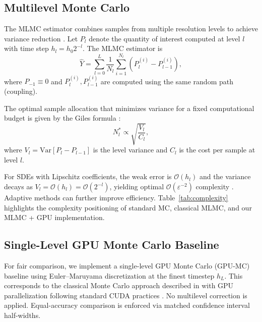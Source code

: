 \documentclass[journal]{IEEEtran}
\begin{document}
\subsection{Multilevel Monte Carlo}

The MLMC estimator combines samples from multiple resolution levels to achieve variance reduction
\cite{giles2008multilevel,giles2015multilevel}. Let $P_l$ denote the quantity of interest
computed at level $l$ with time step $h_l = h_0 2^{-l}$. The MLMC estimator is
\begin{equation}
    \hat{Y} = \sum_{l=0}^{L} \frac{1}{N_l} \sum_{i=1}^{N_l}
    \left(P_l^{(i)} - P_{l-1}^{(i)}\right),
    \label{eq:mlmc}
\end{equation}
where $P_{-1} \equiv 0$ and $P_l^{(i)}, P_{l-1}^{(i)}$ are computed using the same random path
(coupling).

The optimal sample allocation that minimizes variance for a fixed computational budget is given
by the Giles formula \cite{giles2015multilevel}:
\begin{equation}
    N_l^* \propto \sqrt{\frac{V_l}{C_l}},
    \label{eq:giles}
\end{equation}
where $V_l = \mathrm{Var}[P_l - P_{l-1}]$ is the level variance and $C_l$ is the cost per sample
at level $l$.

For SDEs with Lipschitz coefficients, the weak error is $\mathcal{O}(h_l)$ and the variance
decays as $V_l = \mathcal{O}(h_l) = \mathcal{O}(2^{-l})$, yielding optimal
$\mathcal{O}(\varepsilon^{-2})$ complexity \cite{giles2015multilevel,higham2015}. Adaptive
methods \cite{collier2015} can further improve efficiency. Table~\ref{tab:complexity}
highlights the complexity positioning of standard MC, classical MLMC, and our MLMC + GPU
implementation.

\subsection{Single-Level GPU Monte Carlo Baseline}

For fair comparison, we implement a single-level GPU Monte Carlo (GPU-MC) baseline using
Euler--Maruyama discretization at the finest timestep $h_L$. This corresponds to the classical
Monte Carlo approach described in \cite{glasserman2003monte} with GPU parallelization following
standard CUDA practices \cite{nvidia2020cuda,owens2008,harris2007}. No multilevel correction is
applied. Equal-accuracy comparison is enforced via matched confidence interval half-widths.
\end{document}
